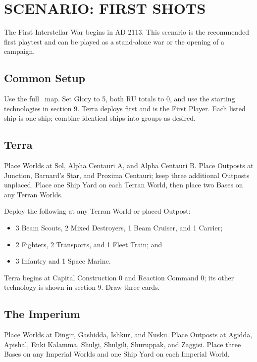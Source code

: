 \section{SCENARIO: FIRST SHOTS}

The First Interstellar War begins in AD 2113. This scenario is the recommended
first playtest and can be played as a stand-alone war or the opening of a
campaign.

\subsection{Common Setup}

Use the full \Imperium\ map. Set Glory to 5, both RU totals to 0, and use the
starting technologies in section 9. Terra deploys first and is the First
Player. Each listed ship is one ship; combine identical ships into groups as
desired.

\subsection{Terra}

Place Worlds at Sol, Alpha Centauri A, and Alpha Centauri B. Place Outposts at
Junction, Barnard's Star, and Proxima Centauri; keep three additional Outposts
unplaced. Place one Ship Yard on each Terran World, then place two Bases on any
Terran Worlds.

Deploy the following at any Terran World or placed Outpost:

\begin{itemize}
  \item 3 Beam Scouts, 2 Mixed Destroyers, 1 Beam Cruiser, and 1 Carrier;
  \item 2 Fighters, 2 Transports, and 1 Fleet Train; and
  \item 3 Infantry and 1 Space Marine.
\end{itemize}

Terra begins at Capital Construction 0 and Reaction Command 0; its other
technology is shown in section 9. Draw three cards.

\subsection{The Imperium}

Place Worlds at Dingir, Gashidda, Ishkur, and Nusku. Place Outposts at Agidda,
Apishal, Enki Kalamma, Shulgi, Shulgili, Shuruppak, and Zaggisi. Place three
Bases on any Imperial Worlds and one Ship Yard on each Imperial World.

